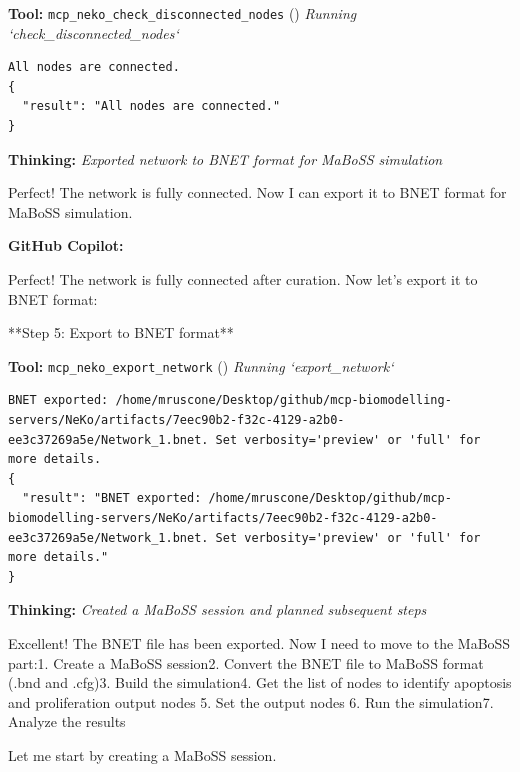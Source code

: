 \documentclass[11pt,a4paper]{article}
\begin{document}
\begin{toolokbox}
\textbf{Tool:} \texttt{mcp\_neko\_check\_disconnected\_nodes} (\checkmark)
\textit{Running `check\_disconnected\_nodes`}
\begin{lstlisting}
All nodes are connected.
{
  "result": "All nodes are connected."
}
\end{lstlisting}
\end{toolokbox}
\begin{thinkbox}
\textbf{Thinking:} \textit{Exported network to BNET format for MaBoSS simulation}

Perfect! The network is fully connected. Now I can export it to BNET format for MaBoSS simulation.

\end{thinkbox}
\begin{copilotbox}
\textbf{GitHub Copilot:}

Perfect! The network is fully connected after curation. Now let's export it to BNET format:

**Step 5: Export to BNET format**

\end{copilotbox}
\begin{toolokbox}
\textbf{Tool:} \texttt{mcp\_neko\_export\_network} (\checkmark)
\textit{Running `export\_network`}
\begin{lstlisting}
BNET exported: /home/mruscone/Desktop/github/mcp-biomodelling-servers/NeKo/artifacts/7eec90b2-f32c-4129-a2b0-ee3c37269a5e/Network_1.bnet. Set verbosity='preview' or 'full' for more details.
{
  "result": "BNET exported: /home/mruscone/Desktop/github/mcp-biomodelling-servers/NeKo/artifacts/7eec90b2-f32c-4129-a2b0-ee3c37269a5e/Network_1.bnet. Set verbosity='preview' or 'full' for more details."
}
\end{lstlisting}
\end{toolokbox}
\begin{thinkbox}
\textbf{Thinking:} \textit{Created a MaBoSS session and planned subsequent steps}

Excellent! The BNET file has been exported. Now I need to move to the MaBoSS part:1. Create a MaBoSS session2. Convert the BNET file to MaBoSS format (.bnd and .cfg)3. Build the simulation4. Get the list of nodes to identify apoptosis and proliferation output nodes
5. Set the output nodes  6. Run the simulation7. Analyze the results

Let me start by creating a MaBoSS session.

\end{thinkbox}
\end{document}
